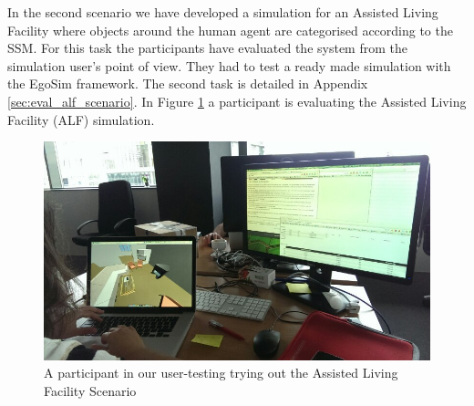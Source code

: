 In the second scenario we have developed a simulation for an Assisted Living Facility where objects around the human agent are categorised according to the SSM. For this task the participants have evaluated the system from the simulation user's point of view. They had to test a ready made simulation with the EgoSim framework. The second task is detailed in Appendix \ref{sec:eval_alf_scenario}. In Figure \ref{fig:eval_alf_tryout} a participant is evaluating the Assisted Living Facility (ALF) simulation.\\
\begin{figure}[H]
	\centering
	\includegraphics[width=\linewidth]{gfx/Chapter5/alf}
	\caption{A participant in our user-testing trying out the Assisted Living Facility Scenario}
	\label{fig:eval_alf_tryout}
\end{figure}

